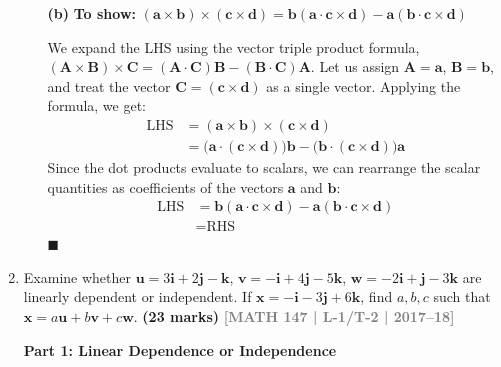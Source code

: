 \documentclass[12pt,a4paper]{article}
\newcommand{\yr}[1]{\hfill\textcolor{gray}{\small\textbf{[#1]}}}
\newcommand{\mk}[1]{\textcolor{orange!70!black}{\small\textbf{(#1 marks)}}}
\begin{document}
\begin{enumerate}
\begin{tcolorbox}[enhanced,breakable,ansbox,colback=cD!4,colframe=cD,boxrule=0.8pt,arc=5pt,title={\textbf{Answer}},fonttitle=\bfseries\color{white},colbacktitle=cD]
\begin{enumerate}
    \vspace{1em}
    \item[\textbf{(b)}] \textbf{To show:} $(\mathbf{a}\times\mathbf{b})\times(\mathbf{c}\times\mathbf{d})=\mathbf{b}(\mathbf{a}\cdot\mathbf{c}\times\mathbf{d})-\mathbf{a}(\mathbf{b}\cdot\mathbf{c}\times\mathbf{d})$
    
    We expand the LHS using the vector triple product formula, $(\mathbf{A}\times\mathbf{B})\times\mathbf{C} = (\mathbf{A}\cdot\mathbf{C})\mathbf{B} - (\mathbf{B}\cdot\mathbf{C})\mathbf{A}$. 
    Let us assign $\mathbf{A} = \mathbf{a}$, $\mathbf{B} = \mathbf{b}$, and treat the vector $\mathbf{C} = (\mathbf{c}\times\mathbf{d})$ as a single vector. Applying the formula, we get:
    \begin{align*}
        \text{LHS} &= (\mathbf{a}\times\mathbf{b})\times(\mathbf{c}\times\mathbf{d}) \\
        &= \big(\mathbf{a}\cdot(\mathbf{c}\times\mathbf{d})\big)\mathbf{b} - \big(\mathbf{b}\cdot(\mathbf{c}\times\mathbf{d})\big)\mathbf{a}
    \end{align*}
    Since the dot products evaluate to scalars, we can rearrange the scalar quantities as coefficients of the vectors $\mathbf{a}$ and $\mathbf{b}$:
    \begin{align*}
        \text{LHS} &= \mathbf{b}(\mathbf{a}\cdot\mathbf{c}\times\mathbf{d}) - \mathbf{a}(\mathbf{b}\cdot\mathbf{c}\times\mathbf{d}) \\
        &= \text{RHS}
    \end{align*}
    \hfill $\blacksquare$
\end{enumerate}

\end{tcolorbox}

\item Examine whether $\mathbf{u}=3\mathbf{i}+2\mathbf{j}-\mathbf{k}$, $\mathbf{v}=-\mathbf{i}+4\mathbf{j}-5\mathbf{k}$, $\mathbf{w}=-2\mathbf{i}+\mathbf{j}-3\mathbf{k}$ are linearly dependent or independent. If $\mathbf{x}=-\mathbf{i}-3\mathbf{j}+6\mathbf{k}$, find $a,b,c$ such that $\mathbf{x}=a\mathbf{u}+b\mathbf{v}+c\mathbf{w}$.
\mk{23} \yr{MATH 147 | L-1/T-2 | 2017--18}

\begin{tcolorbox}[enhanced,breakable,ansbox,colback=cD!4,colframe=cD,boxrule=0.8pt,arc=5pt,title={\textbf{Answer}},fonttitle=\bfseries\color{white},colbacktitle=cD]

\textbf{Part 1: Linear Dependence or Independence}


\end{tcolorbox}
\end{enumerate}
\end{document}

